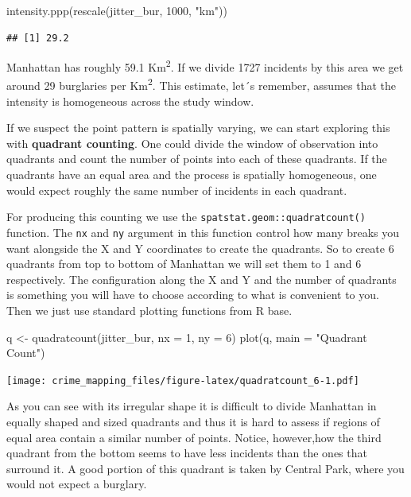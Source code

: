 \documentclass[
  krantz2]{krantz}
\makeatletter
\newenvironment{Shaded}{\begin{snugshade}}{\end{snugshade}}
\newcommand{\AttributeTok}[1]{\textcolor[rgb]{0.61,0.61,0.61}{#1}}
\newcommand{\DecValTok}[1]{\textcolor[rgb]{0.06,0.06,0.06}{#1}}
\newcommand{\FunctionTok}[1]{\textcolor[rgb]{0,0,0}{#1}}
\newcommand{\NormalTok}[1]{#1}
\newcommand{\OtherTok}[1]{\textcolor[rgb]{0.37,0.37,0.37}{#1}}
\newcommand{\StringTok}[1]{\textcolor[rgb]{0.5,0.5,0.5}{#1}}
\newenvironment{kframe}{%
\medskip{}
\setlength{\fboxsep}{.8em}
 \def\at@end@of@kframe{}%
 \ifinner\ifhmode%
  \def\at@end@of@kframe{\end{minipage}}%
  \begin{minipage}{\columnwidth}%
 \fi\fi%
 \def\FrameCommand##1{\hskip\@totalleftmargin \hskip-\fboxsep
 \colorbox{shadecolor}{##1}\hskip-\fboxsep
     \hskip-\linewidth \hskip-\@totalleftmargin \hskip\columnwidth}%
 \MakeFramed {\advance\hsize-\width
   \@totalleftmargin\z@ \linewidth\hsize
   \@setminipage}}%
 {\par\unskip\endMakeFramed%
 \at@end@of@kframe}
\renewenvironment{Shaded}{\begin{kframe}}{\end{kframe}}
\makeatother
\begin{document}
\begin{Shaded}
\begin{Highlighting}[]
\FunctionTok{intensity.ppp}\NormalTok{(}\FunctionTok{rescale}\NormalTok{(jitter\_bur, }\DecValTok{1000}\NormalTok{, }\StringTok{"km"}\NormalTok{))}
\end{Highlighting}
\end{Shaded}

\begin{verbatim}
## [1] 29.2
\end{verbatim}

Manhattan has roughly 59.1 Km\textsuperscript{2}. If we divide 1727 incidents by this area we get around 29 burglaries per Km\textsuperscript{2}. This estimate, let´s remember, assumes that the intensity is homogeneous across the study window.

If we suspect the point pattern is spatially varying, we can start exploring this with \textbf{quadrant counting}. One could divide the window of observation into quadrants and count the number of points into each of these quadrants. If the quadrants have an equal area and the process is spatially homogeneous, one would expect roughly the same number of incidents in each quadrant.

For producing this counting we use the \texttt{spatstat.geom::quadratcount()} function. The \texttt{nx} and \texttt{ny} argument in this function control how many breaks you want alongside the X and Y coordinates to create the quadrants. So to create 6 quadrants from top to bottom of Manhattan we will set them to 1 and 6 respectively. The configuration along the X and Y and the number of quadrants is something you will have to choose according to what is convenient to you. Then we just use standard plotting functions from R base.

\begin{Shaded}
\begin{Highlighting}[]
\NormalTok{q }\OtherTok{\textless{}{-}} \FunctionTok{quadratcount}\NormalTok{(jitter\_bur, }\AttributeTok{nx =} \DecValTok{1}\NormalTok{, }\AttributeTok{ny =} \DecValTok{6}\NormalTok{)}
\FunctionTok{plot}\NormalTok{(q, }\AttributeTok{main =} \StringTok{"Quadrant Count"}\NormalTok{)}
\end{Highlighting}
\end{Shaded}

\texttt{[image: crime\_mapping\_files/figure-latex/quadratcount\_6-1.pdf]}

As you can see with its irregular shape it is difficult to divide Manhattan in equally shaped and sized quadrants and thus it is hard to assess if regions of equal area contain a similar number of points. Notice, however,how the third quadrant from the bottom seems to have less incidents than the ones that surround it. A good portion of this quadrant is taken by Central Park, where you would not expect a burglary.
\end{document}
